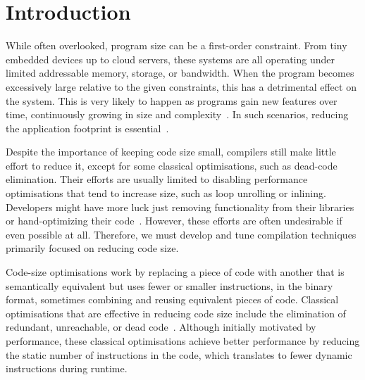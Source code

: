 
\chapter{Introduction}


While often overlooked, program size can be a first-order constraint.
From tiny embedded devices up to cloud servers, these systems are all operating under limited addressable memory, storage, or bandwidth. When the program becomes excessively large relative to the given constraints, this has a detrimental effect on the system.
This is very likely to happen as programs gain new features over time, continuously growing in size and complexity~\cite{lavaee19,chabbi21}.
In such scenarios, reducing the application footprint is essential~\cite{schultz03,varma04,sehgal12,keoh14,auler17,chabbi21}.



Despite the importance of keeping code size small, compilers still make little effort to reduce it, except for some classical optimisations, such as dead-code elimination.
Their efforts are usually limited to disabling performance optimisations that tend to increase size, such as loop unrolling or inlining.
Developers might have more luck just removing functionality from their libraries~\cite{keoh14} or hand-optimizing their code~\cite{weaver09}.
However, these efforts are often undesirable if even possible at all.
Therefore, we must develop and tune compilation techniques primarily focused on reducing code size.

Code-size optimisations work by replacing a piece of code with another that is semantically equivalent but uses fewer or smaller instructions, in the binary format, sometimes combining and reusing equivalent pieces of code.
Classical optimisations that are effective in reducing code size include the elimination of redundant, unreachable, or dead code~\cite{cocke70,briggs97,debray00}.
Although initially motivated by performance, these classical optimisations achieve better performance by reducing the static number of instructions in the code, which translates to fewer dynamic instructions during runtime.

